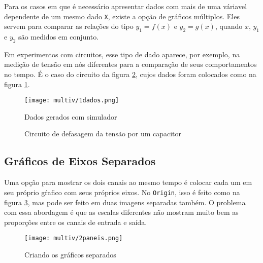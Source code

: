 \edef\indentacao{\the\parindent}

\noindent
\begin{minipage}[t]{0.55\textwidth}\setlength{\parindent}{\indentacao}

    Para os casos em que é necessário apresentar dados com mais de uma váriavel dependente de um mesmo dado \texttt{X}, existe a opção de gráficos múltiplos. Eles servem para comparar as relações do tipo $y_1 = f(x)$ e $y_2 = g(x)$, quando $x$, $y_1$ e $y_2$ são medidos em conjunto.

    Em experimentos com circuitos, esse tipo de dado aparece, por exemplo, na medição de tensão em nós diferentes para a comparação de seus comportamentos no tempo. É o caso do circuito da figura \ref{fig:multiv:circuito}, cujos dados foram colocados como na figura \ref{fig:multiv:dados}.

    \begin{figure}[H]
        \centering
        \texttt{[image: multiv/1dados.png]}

        \caption{Dados gerados com simulador}
        \label{fig:multiv:dados}
    \end{figure}

\end{minipage}\vspace{0.05\textwidth}%
\begin{minipage}[t]{0.4\textwidth}
    \begin{figure}[H]
        \centering
        

        \caption{Circuito de defasagem da tensão por um capacitor}
        \label{fig:multiv:circuito}
    \end{figure}
\end{minipage}


\subsection{Gráficos de Eixos Separados}

    Uma opção para mostrar os dois canais ao mesmo tempo é colocar cada um em seu próprio gŕafico com seus próprios eixos. No \texttt{Origin}, isso é feito como na figura \ref{fig:multiv:paneis:tutorial}, mas pode ser feito em duas imagens separadas também. O problema com essa abordagem é que as escalas diferentes não mostram muito bem as proporções entre os canais de entrada e saída.

    \begin{figure}[H]
        \centering
        \texttt{[image: multiv/2paneis.png]}

        \caption{Criando os gráficos separados}
        \label{fig:multiv:paneis:tutorial}
    \end{figure}

